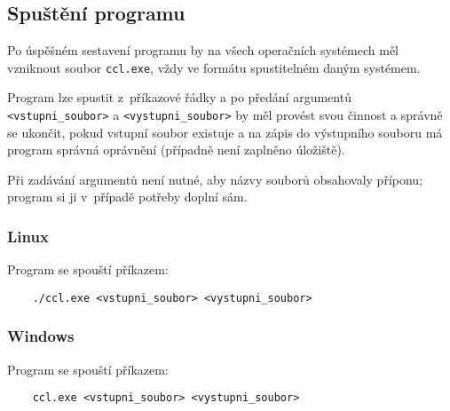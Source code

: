 \subsection{Spuštění programu}

Po úspěšném sestavení programu by na všech operačních systémech měl vzniknout soubor \verb|ccl.exe|, vždy ve formátu
spustitelném daným systémem.

Program lze spustit z~příkazové řádky a po předání argumentů \verb|<vstupni_soubor>| a \verb|<vystupni_soubor>| by měl
provést svou činnost a správně se ukončit, pokud vstupní soubor existuje a na zápis do výstupního souboru má program
správná oprávnění (případně není zaplněno úložiště).

Při zadávání argumentů není nutné, aby názvy souborů obsahovaly příponu; program si ji v~případě potřeby doplní sám.


\subsubsection{Linux}

Program se spouští příkazem:

\begin{verbatim}
    ./ccl.exe <vstupni_soubor> <vystupni_soubor>
\end{verbatim}


\subsubsection{Windows}

Program se spouští příkazem:

\begin{verbatim}
    ccl.exe <vstupni_soubor> <vystupni_soubor>
\end{verbatim}
